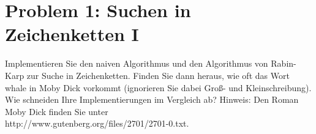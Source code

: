 \section*{Problem 1: Suchen in Zeichenketten I}

Implementieren Sie den naiven Algorithmus und den Algorithmus von Rabin-Karp
zur Suche in Zeichenketten. Finden Sie dann heraus, wie oft das Wort whale in Moby
Dick vorkommt (ignorieren Sie dabei Groß- und Kleinschreibung). Wie schneiden
Ihre Implementierungen im Vergleich ab?
Hinweis: Den Roman Moby Dick finden Sie unter\\
http://www.gutenberg.org/files/2701/2701-0.txt.